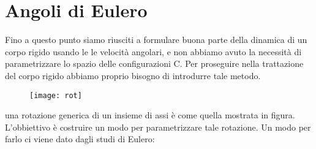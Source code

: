 \section{Angoli di Eulero}

Fino a questo punto siamo riusciti a formulare buona parte della dinamica di un corpo rigido usando le le velocit\`{a} angolari, e non abbiamo avuto la necessit\`{a} di parametrizzare lo spazio delle configurazioni C. Per proseguire nella trattazione del corpo rigido abbiamo proprio bisogno di introdurre tale metodo.

 
\begin{figure}[!ht]
\vspace{0.1in}
\texttt{[image: rot]}	
\centering
\vspace{0.1in}
\end{figure}

una rotazione generica di un insieme di assi \`{e} come quella mostrata in figura. L'obbiettivo \`{e} costruire un modo per parametrizzare tale rotazione. Un modo per farlo ci viene dato dagli studi di Eulero:

